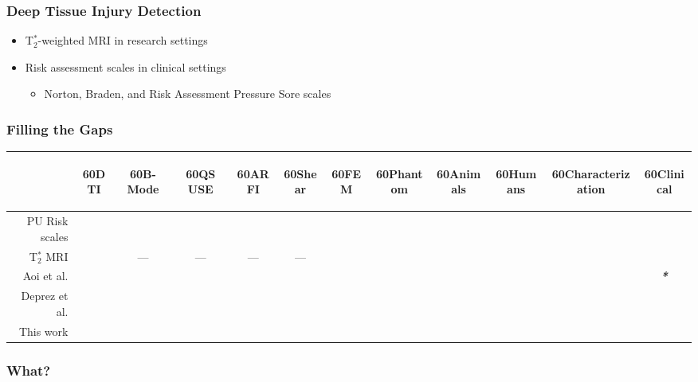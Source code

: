 \documentclass{beamer}
\newcommand{\rotHead}[1]{\begin{rotate}{60}#1\end{rotate}}
\newcommand{\cmark}{\color{ExecusharesBlue}\ding{51}}
\newcommand{\xmark}{\color{ExecusharesRed}\ding{55}}
\begin{document}
		\begin{frame}
			\frametitle{Deep Tissue Injury Detection}
			\begin{itemize}
				\item T$_2^*$-weighted MRI in research settings
				\item Risk assessment scales in clinical settings
				\begin{itemize}
					\item Norton, Braden, and Risk Assessment Pressure Sore scales
				\end{itemize}
			\end{itemize}
		\end{frame}

		\begin{frame}
			\frametitle{Filling the Gaps}
			\begin{center}
				\vspace{1cm}
				\begin{tabular}{r|ccccccccccc}
					& \rotHead{DTI} & \rotHead{B-Mode} & \rotHead{QS USE} & \rotHead{ARFI} & \rotHead{Shear} & \rotHead{FEM} & \rotHead{Phantom} & \rotHead{Animals} & \rotHead{Humans} & \rotHead{Characterization} & \rotHead{Clinical} \\
					\hline
					PU Risk scales & \xmark & \xmark & \xmark & \xmark & \xmark & \xmark & \xmark & \xmark & \cmark & \xmark & \cmark \\
					T$_2^*$ MRI & \cmark & --- & --- & --- & --- & \cmark & \cmark & \cmark& \cmark & \xmark & \xmark \\
					Aoi et al. & \cmark & \cmark & \xmark & \xmark & \xmark & \xmark & \xmark & \xmark & \cmark & \xmark & \cmark\emph{\textbf{*}} \\
					Deprez et al. & \cmark & \xmark & \cmark & \xmark & \xmark & \cmark & \cmark & \cmark & \xmark & \xmark & \cmark \\
					This work & \cmark & \xmark & \cmark & \cmark & \cmark & \cmark & \cmark & \xmark & \xmark & \cmark & \cmark \\
				\end{tabular}
			\end{center}
		\end{frame}

		\begin{frame}
			\frametitle{What?}
		\end{frame}
\end{document}
